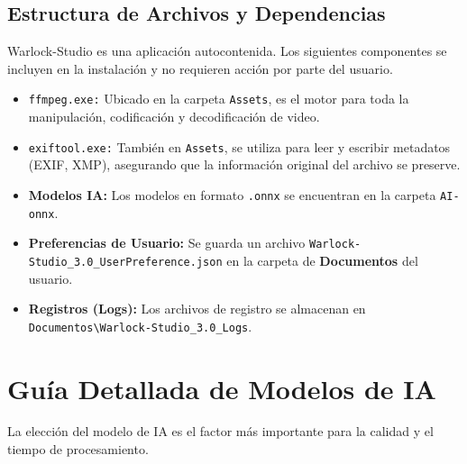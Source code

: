 \documentclass[11pt, a4paper]{article}
\newcommand{\inlinecode}[1]{\colorbox{WarlockLightGray}{\small\texttt{#1}}}
\begin{document}
\subsection{Estructura de Archivos y Dependencias}
\begin{infobox}
Warlock-Studio es una aplicación autocontenida. Los siguientes componentes se incluyen en la instalación y no requieren acción por parte del usuario.
\end{infobox}
\begin{itemize}[leftmargin=*]
    \item \inlinecode{ffmpeg.exe:} Ubicado en la carpeta \texttt{Assets}, es el motor para toda la manipulación, codificación y decodificación de video.
    \item \inlinecode{exiftool.exe:} También en \texttt{Assets}, se utiliza para leer y escribir metadatos (EXIF, XMP), asegurando que la información original del archivo se preserve.
    \item \textbf{Modelos IA:} Los modelos en formato \texttt{.onnx} se encuentran en la carpeta \texttt{AI-onnx}.
    \item \textbf{Preferencias de Usuario:} Se guarda un archivo \inlinecode{Warlock-Studio_3.0_UserPreference.json} en la carpeta de \textbf{Documentos} del usuario.
    \item \textbf{Registros (Logs):} Los archivos de registro se almacenan en \texttt{Documentos\textbackslash Warlock-Studio_3.0_Logs}.
\end{itemize}


\section{Guía Detallada de Modelos de IA}
La elección del modelo de IA es el factor más importante para la calidad y el tiempo de procesamiento.
\end{document}
